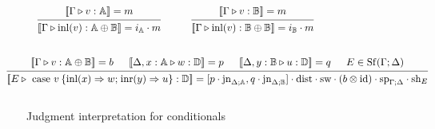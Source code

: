 \documentclass[10pt,a4paper]{amsart}
\theoremstyle{definition}
\theoremstyle{definition}
\theoremstyle{definition}
\theoremstyle{definition}
\theoremstyle{definition}
\theoremstyle{definition}
\begin{document}
\begin{figure}[H]
  \begin{equation*}
  \begin{aligned}
  &\hspace{10pt}
  \begin{prooftree}
      \hypo{ [\![\Gamma \triangleright v: \mathbb{A}]\!] = m }
      \infer1[]{ [\![ \Gamma \triangleright \text{inl} (v):  \mathbb{A} \oplus \mathbb{B}  ]\!] = i_{\mathbb{A}}  \cdot m}
  \end{prooftree}
  \hspace{30pt}
  \begin{prooftree}
    \hypo{ [\![\Gamma \triangleright v: \mathbb{B}]\!] = m }
    \infer1[]{ [\![ \Gamma \triangleright \text{inl} (v):  \mathbb{B} \oplus \mathbb{B}  ]\!] = i_{\mathbb{B}}  \cdot m}
\end{prooftree}
  \\[20pt]
  &\hspace{-20pt}
  \begin{prooftree}
      \hypo{[\![\Gamma\triangleright v: \mathbb{A} \oplus \mathbb{B} ]\!] = b}
      \hypo{[\![\Delta, x:\mathbb{A} \triangleright w: \mathbb{D} ]\!] = p}
      \hypo{ [\![\Delta,y:\mathbb{B} \triangleright u: \mathbb{D} ]\!] = q }
      \hypo{E \in \Shuff(\Gamma; \Delta)}
      \infer4[]{ [\![E \triangleright \text{ case } v \hspace{2pt}  \{\text{inl} (x) \Rightarrow w ; \hspace{1pt} \text{inr} (y) \Rightarrow u\}: \mathbb{D} ]\!] =   [p \cdot \text{jn}_{\Delta;\mathbb{A}},q \cdot \text{jn}_{\Delta;\mathbb{B}}] \cdot \text{dist} \cdot \text{sw} \cdot (b \otimes \text{id}) \cdot \text{sp}_{\Gamma;\Delta} \cdot \text{sh}_{E}}
  \end{prooftree}
  \\[10pt]
  \end{aligned}
  \end{equation*}
  \caption{Judgment interpretation for conditionals}
\label{fig:denotational_sem cond}
\end{figure}







 

\end{document}
